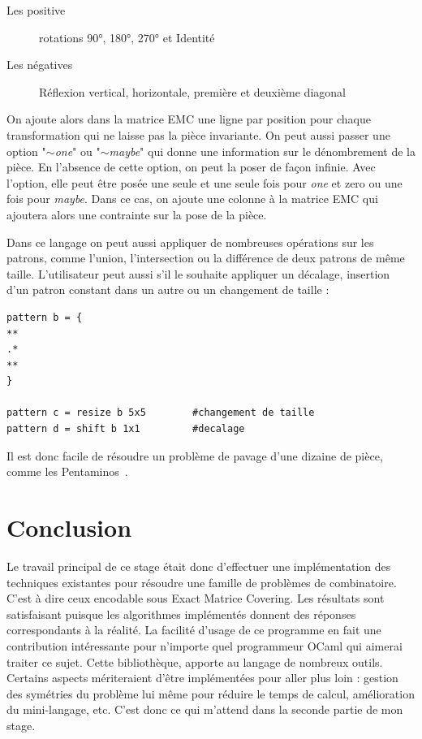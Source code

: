 \documentclass[a4paper]{article}
\begin{document}
\begin{description}
\item[Les positive] rotations 90°, 180°, 270° et Identité
\item[Les négatives] Réflexion vertical, horizontale, première et 
deuxième diagonal
\end{description}
On ajoute alors dans la matrice EMC une ligne par position pour chaque 
transformation qui ne laisse pas la pièce invariante.
On peut aussi passer une option "\emph{$\sim$one}" ou "\emph{$\sim$maybe}" 
qui donne une information sur le dénombrement de
la pièce. En l'absence de cette option, on peut la poser de façon infinie.
Avec l'option, elle peut être posée une seule et une seule fois pour \emph{one}
et zero ou une fois pour \emph{maybe}.
Dans ce cas, on ajoute
une colonne à la matrice EMC qui ajoutera alors une contrainte sur la pose de 
la pièce.

Dans ce langage on peut aussi appliquer de nombreuses opérations sur les 
patrons, comme l'union, l'intersection ou la différence de deux patrons de même 
taille. L'utilisateur peut aussi s'il le souhaite appliquer un décalage,
insertion d'un patron constant dans un autre ou un changement de taille : 

\begin{lstlisting}
pattern b = {
**
.*
**
}

pattern c = resize b 5x5 		#changement de taille
pattern d = shift b 1x1			#decalage
\end{lstlisting}

Il est donc facile de résoudre un problème de pavage d'une dizaine de pièce,
comme les Pentaminos~\cite{pentamino}.

\newpage
\section{Conclusion}

Le travail principal de ce stage était donc d'effectuer une implémentation des
techniques existantes pour résoudre une famille de problèmes de combinatoire. 
C'est à dire ceux encodable sous Exact Matrice Covering. Les résultats sont 
satisfaisant puisque les algorithmes implémentés donnent des réponses 
correspondants à la réalité. La facilité d'usage de ce programme en fait une 
contribution intéressante pour n'importe quel programmeur OCaml qui aimerai
traiter ce sujet. Cette bibliothèque, apporte au langage de 
nombreux outils. Certains aspects mériteraient d'être implémentées pour 
aller plus loin : gestion 
des symétries du problème lui même pour réduire le temps de calcul, amélioration
du mini-langage, etc. 
C'est donc ce qui m'attend dans la seconde partie de mon stage.
\end{document}
